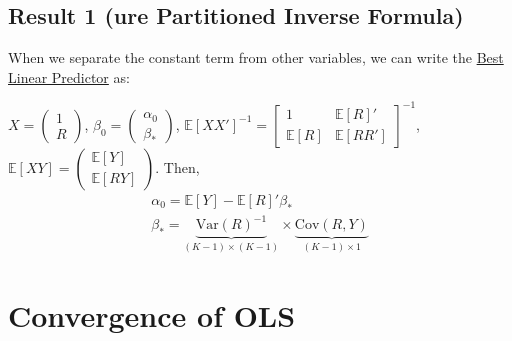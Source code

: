 \documentclass[11pt]{elegantbook}
\begin{document}
\subsection*{Result 1 (ure Partitioned Inverse Formula)}
When we separate the constant term from other variables, we can write the \underline{Best Linear Predictor} as:
\begin{proposition}
    $X=\begin{pmatrix}
        1\\
        R
    \end{pmatrix}$, $\beta_0=\begin{pmatrix}
        \alpha_0\\
        \beta_*
    \end{pmatrix}$, $\mathbb{E}[XX']^{-1}=\begin{bmatrix}
        1	& \mathbb{E}[R]'\\
        \mathbb{E}[R]	&\mathbb{E}[RR']
    \end{bmatrix}^{-1}$, $\mathbb{E}[XY]=\begin{pmatrix}
        \mathbb{E}[Y]\\
        \mathbb{E}[RY]
    \end{pmatrix}$. Then,
    \begin{equation}
        \begin{aligned}
            \alpha_0=\mathbb{E}[Y]-\mathbb{E}[R]'\beta_*\\
            \beta_*=\underbrace{\text{Var}(R)^{-1}}_{(K-1)\times(K-1)}\times \underbrace{\text{Cov}(R,Y)}_{(K-1)\times 1}
        \end{aligned}
        \nonumber
    \end{equation}
\end{proposition}

\section{Convergence of OLS}
\end{document}
